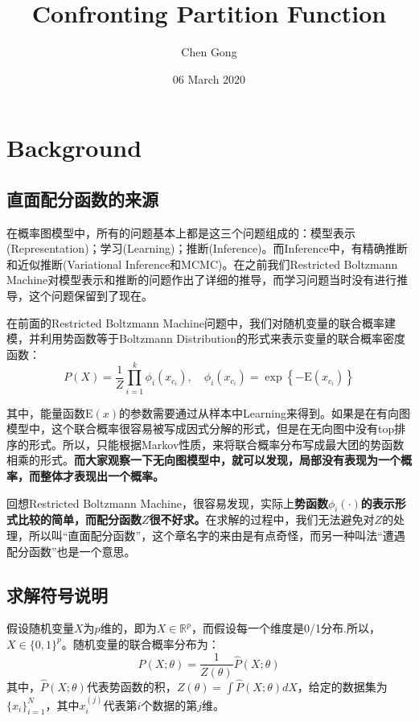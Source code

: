 \documentclass[a4paper]{article}
\title{Confronting Partition Function}
\author{Chen Gong}
\date{06 March 2020}
\begin{document}
\maketitle
\tableofcontents
\newpage
\setcounter{page}{1} %
\clearpage

\section{Background}
\subsection{直面配分函数的来源}
在概率图模型中，所有的问题基本上都是这三个问题组成的：模型表示(Representation)；学习(Learning)；推断(Inference)。而Inference中，有精确推断和近似推断(Variational Inference和MCMC)。在之前我们Restricted Boltzmann Machine对模型表示和推断的问题作出了详细的推导，而学习问题当时没有进行推导，这个问题保留到了现在。

在前面的Restricted Boltzmann Machine问题中，我们对随机变量的联合概率建模，并利用势函数等于Boltzmann Distribution的形式来表示变量的联合概率密度函数：
$$
P(X) = \frac{1}{Z} \prod_{i=1}^k \phi_i (x_{c_i}),\quad \phi_i (x_{c_i}) = \exp \left\{ -\mathrm{E}(x_{c_i}) \right\}
$$

其中，能量函数$\mathrm{E}(x)$的参数需要通过从样本中Learning来得到。如果是在有向图模型中，这个联合概率很容易被写成因式分解的形式，但是在无向图中没有top排序的形式。所以，只能根据Markov性质，来将联合概率分布写成最大团的势函数相乘的形式。\textbf{而大家观察一下无向图模型中，就可以发现，局部没有表现为一个概率，而整体才表现出一个概率。}

回想Restricted Boltzmann Machine，很容易发现，实际上\textbf{势函数$\phi_i(\cdot)$的表示形式比较的简单，而配分函数$Z$很不好求。}在求解的过程中，我们无法避免对$Z$的处理，所以叫“直面配分函数”，这个章名字的来由是有点奇怪，而另一种叫法“遭遇配分函数”也是一个意思。

\subsection{求解符号说明}
假设随机变量$X$为$p$维的，即为$X\in \mathbb{R}^p$，而假设每一个维度是0/1分布.所以，$X\in \{0,1\}^p$。随机变量的联合概率分布为：
\begin{equation}
    P(X;\theta) = \frac{1}{Z(\theta)}\hat{P}(X;\theta)
\end{equation}
其中，$\hat{P}(X;\theta)$代表势函数的积，$Z(\theta)= \int \hat{P}(X;\theta)dX$，给定的数据集为$\{x_i\}_{i=1}^N$，其中$x_i^{(j)}$代表第$i$个数据的第$j$维。
\end{document}
